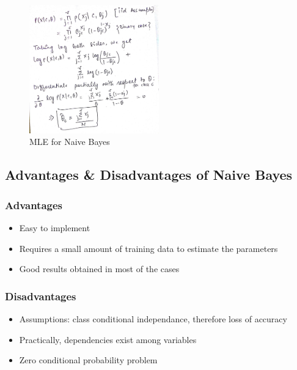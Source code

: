 \begin{figure}[H]
  \begin{center}
    \includegraphics[width=0.5\textwidth]{mle.png}
    \caption{
      MLE for Naive Bayes}
  \end{center}
\end{figure}

\subsection{Advantages \& Disadvantages of Naive Bayes}
\subsubsection{Advantages}
\begin{itemize}
    \item Easy to implement
    \item Requires a small amount of training data to estimate the parameters
    \item Good results obtained in most of the cases
\end{itemize}

\subsubsection{Disadvantages}
\begin{itemize}
    \item Assumptions: class conditional independance, therefore loss of accuracy
    \item Practically, dependencies exist among variables
    \item Zero conditional probability problem
\end{itemize}

